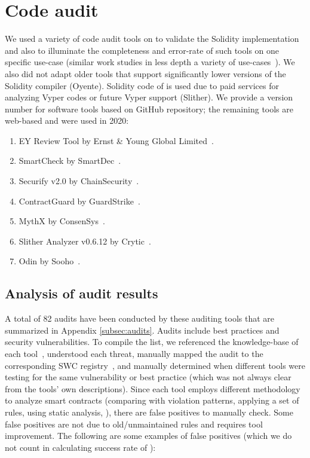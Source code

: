 
\section{Code audit}\label{sec:tools}
We used a variety of code audit tools on \sys to validate the Solidity implementation and also to illuminate the completeness and error-rate of such tools on one specific use-case (similar work studies in less depth a variety of use-cases~\cite{AuditTools}). We also did not adapt older tools that support significantly lower versions of the Solidity compiler (\eg Oyente). Solidity code of \sys is used due to paid services for analyzing Vyper codes or future Vyper support (\eg Slither). We provide a version number for software tools based on GitHub repository; the remaining tools are web-based and were used in 2020:

\begin{enumerate}[\setlength{\labelsep}{3pt}\setlength{\IEEElabelindent}{0pt}]
	\item EY Review Tool by Ernst \& Young Global Limited~\cite{EYTool}.
	\item SmartCheck by SmartDec~\cite{SMARTCHECK}.
	\item Securify v2.0 by ChainSecurity~\cite{SECURIFYGIT,SECURIFY}.
	\item ContractGuard by GuardStrike~\cite{ContractGuard}.
	\item MythX by ConsenSys~\cite{MythX}.
	\item Slither Analyzer v0.6.12 by Crytic~\cite{SlitherDoc}.
	\item Odin by Sooho~\cite{Odin}.
\end{enumerate}

\subsection{Analysis of audit results}
A total of 82 audits have been conducted by these auditing tools that are summarized in Appendix \ref{subsec:audits}. Audits include best practices and security vulnerabilities. To compile the list, we referenced the knowledge-base of each tool~\cite{SECURIFYGIT,SMARTCHECK,MythX,ContractGuard,SlitherDoc}, understood each threat, manually mapped the audit to the corresponding SWC registry~\cite{SWC}, and manually determined when different tools were testing for the same vulnerability or best practice (which was not always clear from the tools' own descriptions). Since each tool employs different methodology to analyze smart contracts (\eg comparing with violation patterns, applying a set of rules, using static analysis, \etc), there are false positives to manually check. Some false positives are not due to old/unmaintained rules and requires tool improvement. The following are some examples of false positives (which we do not count in calculating success rate of \sys):

